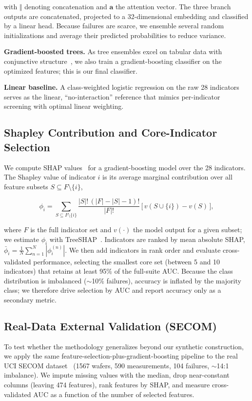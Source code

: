 \documentclass[electronics,article,submit,pdftex,moreauthors]{Definitions/mdpi}
\begin{document}
with $\Vert$ denoting concatenation and $\mathbf{a}$ the attention vector. The three branch outputs are concatenated, projected to a 32-dimensional embedding and classified by a linear head. Because failures are scarce, we ensemble several random initializations and average their predicted probabilities to reduce variance.

\textbf{Gradient-boosted trees.} As tree ensembles excel on tabular data with conjunctive structure~\cite{friedman2001greedy,chen2016xgboost}, we also train a gradient-boosting classifier on the optimized features; this is our final classifier.

\textbf{Linear baseline.} A class-weighted logistic regression on the raw 28 indicators serves as the linear, ``no-interaction'' reference that mimics per-indicator screening with optimal linear weighting.

\subsection{Shapley Contribution and Core-Indicator Selection}\label{sec:shap}
We compute SHAP values~\cite{lundberg2017unified,lundberg2020local} for a gradient-boosting model over the 28 indicators. The Shapley value of indicator $i$ is its average marginal contribution over all feature subsets $S\subseteq F\setminus\{i\}$,

\begin{equation}
\phi_i = \sum_{S\subseteq F\setminus\{i\}} \frac{|S|!\,(|F|-|S|-1)!}{|F|!}\,\big[\,v(S\cup\{i\}) - v(S)\,\big],
\label{eq:shapley}
\end{equation}

where $F$ is the full indicator set and $v(\cdot)$ the model output for a given subset; we estimate $\phi_i$ with TreeSHAP~\cite{lundberg2020local}. Indicators are ranked by mean absolute SHAP, $\bar{\phi}_i = \frac{1}{N}\sum_{n=1}^{N}|\phi_i^{(n)}|$. We then add indicators in rank order and evaluate cross-validated performance, selecting the smallest core set (between 5 and 10 indicators) that retains at least 95\% of the full-suite AUC. Because the class distribution is imbalanced ($\sim$10\% failures), accuracy is inflated by the majority class; we therefore drive selection by AUC and report accuracy only as a secondary metric.

\subsection{Real-Data External Validation (SECOM)}
To test whether the methodology generalizes beyond our synthetic construction, we apply the same feature-selection-plus-gradient-boosting pipeline to the real UCI SECOM dataset~\cite{mccann2008secom} (1567 wafers, 590 measurements, 104 failures, $\sim$14:1 imbalance). We impute missing values with the median, drop near-constant columns (leaving 474 features), rank features by SHAP, and measure cross-validated AUC as a function of the number of selected features.
\end{document}
